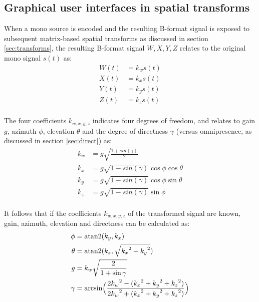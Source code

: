 \documentclass{article}
\begin{document}
\subsection{Graphical user interfaces in spatial transforms}\label{sec:gui}

When a mono source is encoded and the resulting B-format signal is exposed to subsequent matrix-based spatial transforms as discussed in section \ref{sec:transforms}, the resulting B-format signal $W, X, Y, Z$ relates to the original mono signal $s(t)$ as:
\begin{equation} \label{eq:encoded}
\begin{split}
W(t) & = k_w s(t) \\
X(t) & = k_x s(t) \\
Y(t) & = k_y s(t) \\
Z(t) & = k_z s(t) \\
\end{split}
\end{equation}

The four coefficients $k_{w, x, y, z}$ indicates four degrees of freedom, and relates to gain $g$, azimuth $\phi$, elevation $\theta$ and the degree of directness $\gamma$ (versus omnipresence, as discussed in section \ref{sec:direct}) as:
\begin{equation} \label{eq:encodedCoefficients}
\begin{split}
k_w & = g \sqrt{ \frac{1 + sin(\gamma)} {2} } \\
k_x & = g \sqrt{ 1 - sin(\gamma) } \cos{\phi} \cos{\theta} \\
k_y & = g \sqrt{ 1 - sin(\gamma) } \cos{\phi} \sin{\theta} \\
k_z & = g \sqrt{ 1 - sin(\gamma) } \sin{\phi}               \\
\end{split}
\end{equation}

It follows that if the coefficients $k_{w, x, y, z}$ of the transformed signal are known, gain, azimuth, elevation and directness can be calculated as:
\begin{equation} \label{eq:interpreteCoefficients}
\begin{split}
\phi   & = \textnormal{atan2}(k_y, k_x) \\
\theta & = \textnormal{atan2}(k_z, \sqrt{{k_x}^2 + {k_y}^2}) \\
g      & = k_w \sqrt{ \frac{2}{1 + \sin{\gamma} } }\\
\gamma & = \textnormal{arcsin} \Big( \frac{2 {k_w}^2 - ({k_x}^2 + {k_y}^2 +{k_z}^2)} {2 {k_w}^2 + ({k_x}^2 + {k_y}^2 +{k_z}^2 )} \Big)
\end{split}
\end{equation}
\end{document}
